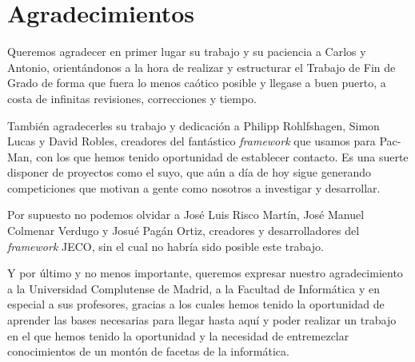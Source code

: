 \chapter{Agradecimientos} \label{cap:agradecimientos}
Queremos agradecer en primer lugar su trabajo y su paciencia a Carlos y Antonio, orientándonos a la hora de realizar y estructurar el Trabajo de Fin de Grado de forma que fuera lo menos caótico posible y llegase a buen puerto, a costa de infinitas revisiones, correcciones y tiempo.
 
También agradecerles su trabajo y dedicación a Philipp Rohlfshagen, Simon Lucas y David Robles, creadores del fantástico \textit{framework} que usamos para Pac-Man, con los que hemos tenido oportunidad de establecer contacto. Es una suerte disponer de proyectos como el suyo, que aún a día de hoy sigue generando competiciones que motivan a gente como nosotros a investigar y desarrollar.
 
Por supuesto no podemos olvidar a José Luis Risco Martín, José Manuel Colmenar Verdugo y Josué Pagán Ortiz, creadores y desarrolladores del \textit{framework}  JECO, sin el cual no habría sido posible este trabajo.
 
Y por último y no menos importante, queremos expresar nuestro agradecimiento a la Universidad Complutense de Madrid, a la Facultad de Informática y en especial a sus profesores, gracias a los cuales hemos tenido la oportunidad de aprender las bases necesarias para llegar hasta aquí y poder realizar un trabajo en el que hemos tenido la oportunidad y la necesidad de entremezclar conocimientos de un montón de facetas de la informática.
